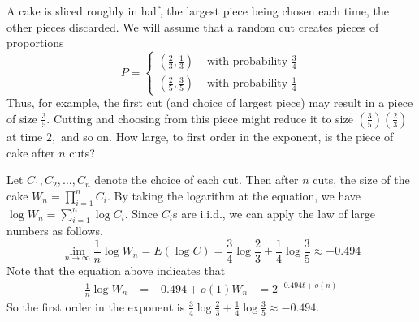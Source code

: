 \begin{exercise}{ A cake is sliced roughly in half, the largest piece being chosen each time, the other pieces discarded. We will assume that a random cut creates pieces of proportions
  $$
  P=\left\{\begin{array}{ll}
  \left(\frac{2}{3}, \frac{1}{3}\right) & \text { with probability } \frac{3}{4} \\
  \left(\frac{2}{5}, \frac{3}{5}\right) & \text { with probability } \frac{1}{4}
  \end{array}\right.
  $$
  Thus, for example, the first cut (and choice of largest piece) may result in a piece of size $\frac{3}{5} .$ Cutting and choosing from this piece might reduce it to size $\left(\frac{3}{5}\right)\left(\frac{2}{3}\right)$ at time $2,$ and so on. How large, to first order in the exponent, is the piece of cake after $n$ cuts?}
  \begin{solution}
  Let $C_1, C_2, \ldots, C_n$ denote the choice of each cut. Then after $n$ cuts, the size of the cake $W_n = \prod_{i=1}^n C_i$. By taking the logarithm at the equation, we have $\log W_n = \sum_{i=1}^n \log C_i$. Since $C_i$s are i.i.d., we can apply the law of large numbers as follows.
  \begin{equation}
    \lim_{n\rightarrow\infty}\frac{1}{n} \log W_n = E(\log C) = \frac{3}{4}\log \frac{2}{3} + \frac{1}{4} \log \frac{3}{5} \approx -0.494
  \end{equation}
  Note that the equation above indicates that
  \begin{equation}
    \begin{aligned}
      \frac{1}{n} \log W_n &= -0.494 + o(1)
      W_n &= 2^{-0.494t +o(n)}
    \end{aligned}
  \end{equation}
  So the first order in the exponent is $\frac{3}{4}\log \frac{2}{3} + \frac{1}{4} \log \frac{3}{5} \approx -0.494$.
  \end{solution}
  \label{ex6}
\end{exercise}

